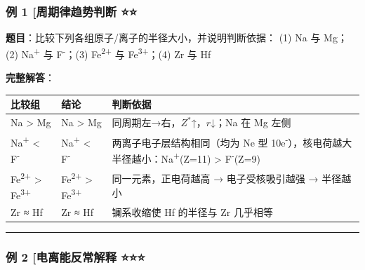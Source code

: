 \documentclass[a4paper,11pt]{ctexart}
\newcounter{none}
\begin{document}
\subsubsection{例 1 {[}周期律趋势判断 ⭐⭐}\label{ux4f8b-1-ux5468ux671fux5f8bux8d8bux52bfux5224ux65ad}

\textbf{题目}：比较下列各组原子/离子的半径大小，并说明判断依据：
(1) Na 与 Mg；(2) Na\textsuperscript{+} 与 F\textsuperscript{-}；(3) Fe\textsuperscript{2+} 与 Fe\textsuperscript{3+}；(4) Zr 与 Hf

\textbf{完整解答}：

{\def\LTcaptype{none} %
\begin{longtable}[]{@{}
  >{\raggedright\arraybackslash}p{}
  >{\centering\arraybackslash}p{}
  >{\raggedright\arraybackslash}p{}@{}}
\toprule\noalign{}
\begin{minipage}[b]{\linewidth}\raggedright
比较组
\end{minipage} & \begin{minipage}[b]{\linewidth}\centering
结论
\end{minipage} & \begin{minipage}[b]{\linewidth}\raggedright
判断依据
\end{minipage} \\
\midrule\noalign{}
\endhead
\bottomrule\noalign{}
\endlastfoot
Na \textgreater{} Mg & Na \textgreater{} Mg & 同周期左→右，\(Z^*\)↑，\(r\)↓；Na 在 Mg 左侧 \\
Na\textsuperscript{+} \textless{} F\textsuperscript{-} & Na\textsuperscript{+} \textless{} F\textsuperscript{-} & 两离子电子层结构相同（均为 Ne 型 10e\textsuperscript{-}），核电荷越大半径越小：Na\textsuperscript{+}(Z=11) \textgreater{} F\textsuperscript{-}(Z=9) \\
Fe\textsuperscript{2+} \textgreater{} Fe\textsuperscript{3+} & Fe\textsuperscript{2+} \textgreater{} Fe\textsuperscript{3+} & 同一元素，正电荷越高 → 电子受核吸引越强 → 半径越小 \\
Zr ≈ Hf & Zr ≈ Hf & 镧系收缩使 Hf 的半径与 Zr 几乎相等 \\
\end{longtable}
}

\begin{center}\rule{0.5\linewidth}{0.5pt}\end{center}

\subsubsection{例 2 {[}电离能反常解释 ⭐⭐⭐}\label{ux4f8b-2-ux7535ux79bbux80fdux53cdux5e38ux89e3ux91ca}
\end{document}

